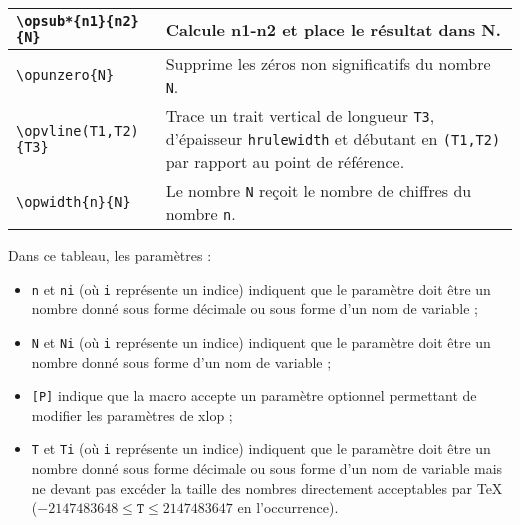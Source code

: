 \documentclass[12pt]{report}
\newcommand\package[1]{\textsf{#1}}
\begin{document}
\begin{longtable}{|l|p{6.3cm}|}
  \verb+\opsub*{n1}{n2}{N}+ &
  Calcule n1-n2 et place le résultat dans N. \\\hline
  \verb+\opunzero{N}+ &
  Supprime les zéros non significatifs du nombre \verb+N+. \\\hline
  \verb+\opvline(T1,T2){T3}+ &
  Trace un trait vertical de longueur \verb+T3+, d'épaisseur
  \verb+hrulewidth+ et débutant en \verb+(T1,T2)+ par
  rapport au point de référence. \\\hline
  \verb+\opwidth{n}{N}+ &
  Le nombre \verb+N+ reçoit le nombre de chiffres du nombre
  \verb+n+. \\\hline
\end{longtable}

Dans ce tableau, les paramètres :
\begin{itemize}
\item \texttt{n} et \texttt{ni} (où \texttt{i} représente un indice)
  indiquent que le paramètre doit être un nombre donné sous forme
  décimale ou sous forme d'un nom de variable ;
\item \texttt{N} et \texttt{Ni} (où \texttt{i} représente un indice)
  indiquent que le paramètre doit être un nombre donné sous forme d'un
  nom de variable ;
\item \texttt{[P]} indique que la macro accepte un paramètre optionnel
  permettant de modifier les paramètres de \package{xlop} ;
\item \texttt{T} et \texttt{Ti} (où \texttt{i} représente un indice)
  indiquent que le paramètre doit être un nombre donné sous forme
  décimale ou sous forme d'un nom de variable mais ne devant pas
  excéder la taille des nombres directement acceptables par \TeX{}
  ($-2147483648 \le \mathtt{T} \le 2147483647$ en l'occurrence).
\end{itemize}

\newpage
\end{document}
